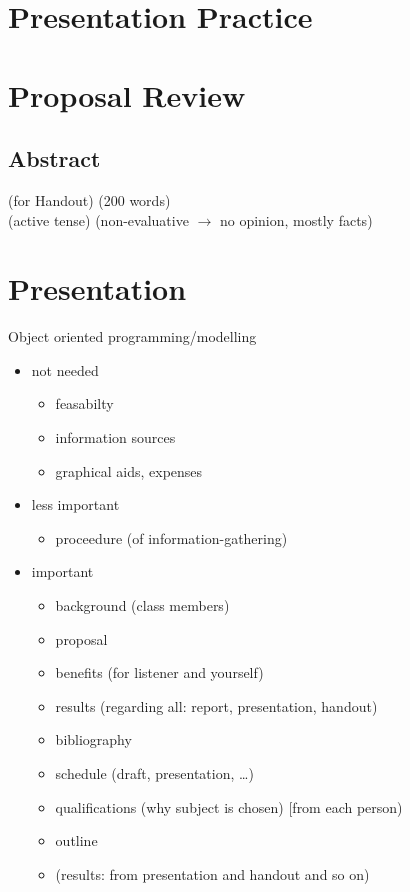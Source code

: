 \documentclass{scrreprt}
\begin{document}
\section{Presentation Practice}

\section{Proposal Review}

\subsection{Abstract}
(for Handout) (200 words)\\
(active tense) (non-evaluative $\to$ no opinion, mostly facts)

\section{Presentation}
Object oriented programming/modelling
\begin{itemize}
\item not needed
\begin{itemize}
\item feasabilty
\item information sources
\item graphical aids, expenses
\end{itemize}
\item less important
\begin{itemize}
\item proceedure (of information-gathering)
\end{itemize}
\item important
\begin{itemize}
\item background (class members)
\item proposal
\item benefits (for listener and yourself)
\item results (regarding all: report, presentation, handout)
\item bibliography
\item schedule (draft, presentation, …)
\item qualifications (why subject is chosen) [from each person)
\item outline
\item (results: from presentation and handout and so on)
\end{itemize}
\end{itemize}
\end{document}
